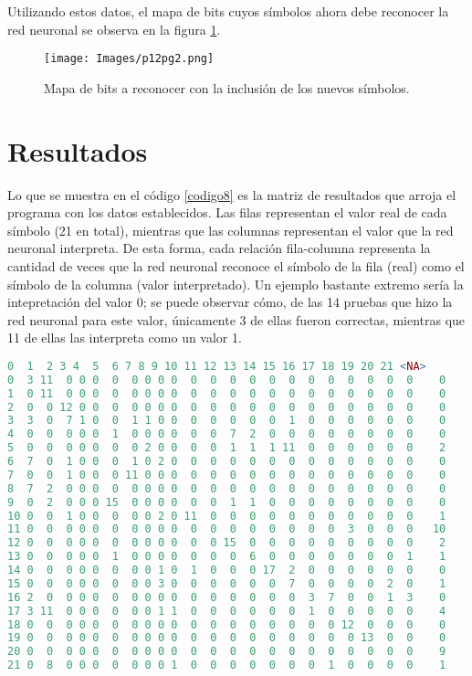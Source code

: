 \documentclass{report}
\begin{document}
Utilizando estos datos, el mapa de bits cuyos s\'imbolos ahora debe reconocer la red neuronal se observa en la figura \ref{fig3}.

\begin{figure}
    \centering
    \texttt{[image: Images/p12pg2.png]}
    \caption{Mapa de bits a reconocer con la inclusi\'on de los nuevos s\'imbolos.}
    \label{fig3}
\end{figure}

\newpage

\section{Resultados}

Lo que se muestra en el c\'odigo \ref{codigo8} es la matriz de resultados que arroja el programa con los datos establecidos. Las filas representan el valor real de cada s\'imbolo (21 en total), mientras que las columnas representan el valor que la red neuronal interpreta. De esta forma, cada relaci\'on fila-columna representa la cantidad de veces que la red neuronal reconoce el s\'imbolo de la fila (real) como el s\'imbolo de la columna (valor interpretado). Un ejemplo bastante extremo ser\'ia la intepretaci\'on del valor 0; se puede observar c\'omo, de las 14 pruebas que hizo la red neuronal para este valor, \'unicamente 3 de ellas fueron correctas, mientras que 11 de ellas las interpreta como un valor 1.

\begin{lstlisting}[caption=Matriz de Interpretaci\'on, label=codigo8, language=R]
   0  1  2 3 4  5  6 7 8 9 10 11 12 13 14 15 16 17 18 19 20 21 <NA>
0  3 11  0 0 0  0  0 0 0 0  0  0  0  0  0  0  0  0  0  0  0  0    0
1  0 11  0 0 0  0  0 0 0 0  0  0  0  0  0  0  0  0  0  0  0  0    0
2  0  0 12 0 0  0  0 0 0 0  0  0  0  0  0  0  0  0  0  0  0  0    0
3  3  0  7 1 0  0  1 1 0 0  0  0  0  0  0  1  0  0  0  0  0  0    0
4  0  0  0 0 0  1  0 0 0 0  0  0  7  2  0  0  0  0  0  0  0  0    0
5  0  0  0 0 0  0  0 2 0 0  0  0  1  1  1 11  0  0  0  0  0  0    2
6  7  0  1 0 0  0  1 0 2 0  0  0  0  0  0  0  0  0  0  0  0  0    0
7  0  0  1 0 0  0 11 0 0 0  0  0  0  0  0  0  0  0  0  0  0  0    0
8  7  2  0 0 0  0  0 0 0 0  0  0  0  0  0  0  0  0  0  0  0  0    0
9  0  2  0 0 0 15  0 0 0 0  0  0  1  1  0  0  0  0  0  0  0  0    0
10 0  0  1 0 0  0  0 0 2 0 11  0  0  0  0  0  0  0  0  0  0  0    1
11 0  0  0 0 0  0  0 0 0 0  0  0  0  0  0  0  0  0  3  0  0  0   10
12 0  0  0 0 0  0  0 0 0 0  0  0 15  0  0  0  0  0  0  0  0  0    2
13 0  0  0 0 0  1  0 0 0 0  0  0  0  6  0  0  0  0  0  0  0  1    1
14 0  0  0 0 0  0  0 0 1 0  1  0  0  0 17  2  0  0  0  0  0  0    0
15 0  0  0 0 0  0  0 0 3 0  0  0  0  0  0  7  0  0  0  0  2  0    1
16 2  0  0 0 0  0  0 0 0 0  0  0  0  0  0  0  3  7  0  0  1  3    0
17 3 11  0 0 0  0  0 0 1 1  0  0  0  0  0  0  1  0  0  0  0  0    4
18 0  0  0 0 0  0  0 0 0 0  0  0  0  0  0  0  0  0 12  0  0  0    0
19 0  0  0 0 0  0  0 0 0 0  0  0  0  0  0  0  0  0  0 13  0  0    0
20 0  0  0 0 0  0  0 0 0 0  0  0  0  0  0  0  0  0  0  0  0  0    9
21 0  8  0 0 0  0  0 0 0 1  0  0  0  0  0  0  0  1  0  0  0  0    1
\end{lstlisting}
\end{document}
